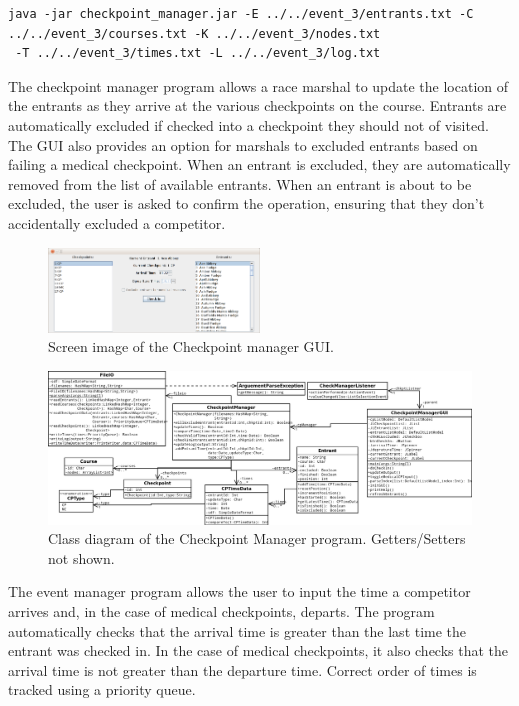 \documentclass{article}
\begin{document}
\begin{center}
	\begin{lstlisting}[showstringspaces=false]
java -jar checkpoint_manager.jar -E ../../event_3/entrants.txt -C ../../event_3/courses.txt -K ../../event_3/nodes.txt
 -T ../../event_3/times.txt -L ../../event_3/log.txt

	\end{lstlisting}
\end{center}

The checkpoint manager program allows a race marshal to update the location of the entrants as they arrive at the various checkpoints on the course. Entrants are automatically excluded if checked into a checkpoint they should not of visited. The GUI also provides an option for marshals to excluded entrants based on failing a medical checkpoint. When an entrant is excluded, they are automatically removed from the list of available entrants. When an entrant is about to be excluded, the user is asked to confirm the operation, ensuring that they don't accidentally excluded a competitor.

\begin{figure}[H]
\centering
\includegraphics[width=0.5\textwidth]{img/GUI-screenshot.png}
\caption{Screen image of the Checkpoint manager GUI.}
\label{fig:GUI-image}
\end{figure}

\begin{figure}[H]
\centering
\includegraphics[width=1\textwidth]{diagrams/checkpoint_manager.png}
\caption{Class diagram of the Checkpoint Manager program. Getters/Setters not shown.}
\label{fig:GUI-image}
\end{figure}

The event manager program allows the user to input the time a competitor arrives and, in the case of medical checkpoints, departs. The program automatically checks that the arrival time is greater than the last time the entrant was checked in. In the case of medical checkpoints, it also checks that the arrival time is not greater than the departure time. Correct order of times is tracked using a priority queue.
\end{document}
